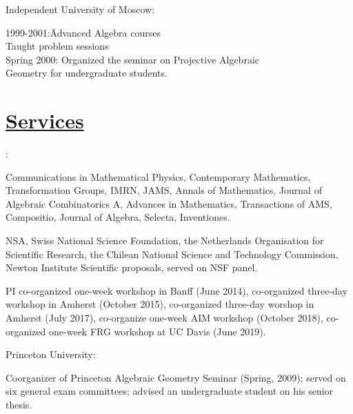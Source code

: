 \documentclass[11pt]{amsart}
\theoremstyle{plain}
\theoremstyle{definition}
\theoremstyle{remark}
\begin{document}
\medskip
\noindent Independent University of Moscow:
\begin{tabbing}
1999-2001:\quad\quad\quad\=  Advanced Algebra courses\\ \> Taught
problem sessions\\
Spring 2000: \>Organized the seminar  on Projective Algebraic\\
\>Geometry for undergraduate students.
\end{tabbing}











\section*{\Large \underline{Services}}

:

\medskip

\medskip

 Communications in Mathematical Physics, Contemporary
Mathematics, Transformation Groups, IMRN, JAMS, Annals of Mathematics, Journal of Algebraic Combinatorics A, Advances in Mathematics, Transactions of AMS, Compositio, Journal of Algebra, Selecta, Inventiones.
\medskip  

 NSA, Swiss National Science Foundation,
 the Netherlands Organisation for Scientific Research, the Chilean National Science and Technology Commission,
Newton Institute Scientific proposals, served on NSF panel.


\medskip

PI co-organized one-week workshop in Banff (June 2014), co-organized three-day workshop in Amherst (October 2015), co-organized
three-day worshop in Amherst (July 2017), co-organize one-week AIM workshop (October 2018), co-organized one-week FRG workshop
at UC Davis (June 2019).

\medskip

\medskip


\medskip

\noindent Princeton University:



\noindent Coorganizer of Princeton Algebraic Geometry Seminar (Spring, 2009); served on six general exam committees; advised an undergraduate student on his senior thesis.
\end{document}
